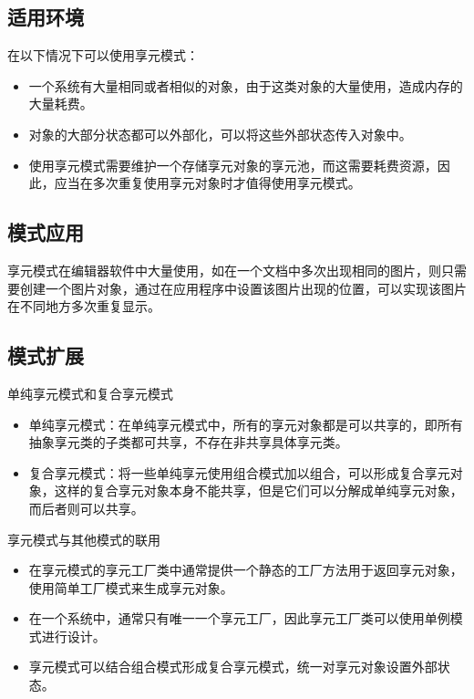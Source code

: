 \documentclass[letterpaper,10pt,english]{sphinxmanual}
\begin{document}
\subsection{适用环境}
\label{\detokenize{structural_patterns/flyweight:id12}}
\sphinxAtStartPar
在以下情况下可以使用享元模式：
\begin{itemize}
\item {} 
\sphinxAtStartPar
一个系统有大量相同或者相似的对象，由于这类对象的大量使用，造成内存的大量耗费。

\item {} 
\sphinxAtStartPar
对象的大部分状态都可以外部化，可以将这些外部状态传入对象中。

\item {} 
\sphinxAtStartPar
使用享元模式需要维护一个存储享元对象的享元池，而这需要耗费资源，因此，应当在多次重复使用享元对象时才值得使用享元模式。

\end{itemize}


\subsection{模式应用}
\label{\detokenize{structural_patterns/flyweight:id13}}
\sphinxAtStartPar
享元模式在编辑器软件中大量使用，如在一个文档中多次出现相同的图片，则只需要创建一个图片对象，通过在应用程序中设置该图片出现的位置，可以实现该图片在不同地方多次重复显示。


\subsection{模式扩展}
\label{\detokenize{structural_patterns/flyweight:id14}}
\sphinxAtStartPar
单纯享元模式和复合享元模式
\begin{itemize}
\item {} 
\sphinxAtStartPar
单纯享元模式：在单纯享元模式中，所有的享元对象都是可以共享的，即所有抽象享元类的子类都可共享，不存在非共享具体享元类。

\item {} 
\sphinxAtStartPar
复合享元模式：将一些单纯享元使用组合模式加以组合，可以形成复合享元对象，这样的复合享元对象本身不能共享，但是它们可以分解成单纯享元对象，而后者则可以共享。

\end{itemize}

\sphinxAtStartPar
享元模式与其他模式的联用
\begin{itemize}
\item {} 
\sphinxAtStartPar
在享元模式的享元工厂类中通常提供一个静态的工厂方法用于返回享元对象，使用简单工厂模式来生成享元对象。

\item {} 
\sphinxAtStartPar
在一个系统中，通常只有唯一一个享元工厂，因此享元工厂类可以使用单例模式进行设计。

\item {} 
\sphinxAtStartPar
享元模式可以结合组合模式形成复合享元模式，统一对享元对象设置外部状态。

\end{itemize}
\end{document}
